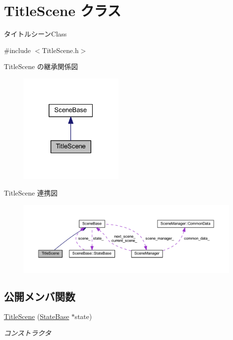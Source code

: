 \hypertarget{class_title_scene}{}\section{Title\+Scene クラス}
\label{class_title_scene}


タイトルシーン\+Class  




{\ttfamily \#include $<$Title\+Scene.\+h$>$}



Title\+Scene の継承関係図
\nopagebreak
\begin{figure}[H]
\begin{center}
\leavevmode
\includegraphics[width=147pt]{class_title_scene__inherit__graph}
\end{center}
\end{figure}


Title\+Scene 連携図
\nopagebreak
\begin{figure}[H]
\begin{center}
\leavevmode
\includegraphics[width=350pt]{class_title_scene__coll__graph}
\end{center}
\end{figure}
\subsection*{公開メンバ関数}
\begin{DoxyCompactItemize}
\item 
\mbox{\hyperlink{class_title_scene_a433ef854689b1c9defb29d9f999c52da}{Title\+Scene}} (\mbox{\hyperlink{class_scene_base_1_1_state_base}{State\+Base}} $\ast$state)
\begin{DoxyCompactList}\small\item\em コンストラクタ \end{DoxyCompactList}\end{DoxyCompactItemize}


